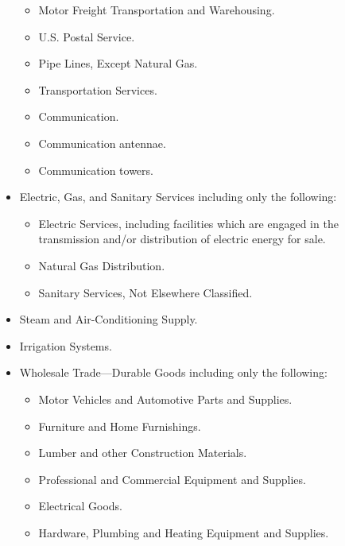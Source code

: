 \begin{itemize}
\begin{itemize}
\item Motor Freight Transportation and Warehousing.

\item U.S. Postal Service.

\item Pipe Lines, Except Natural Gas.

\item Transportation Services.

\item Communication.

\item Communication antennae.

\item Communication towers.
\end{itemize}
\item Electric, Gas, and Sanitary Services including only the following:
\begin{itemize}
\item Electric Services, including facilities which are engaged in the
transmission and/or distribution of electric energy for sale.

\item Natural Gas Distribution.

\item Sanitary Services, Not Elsewhere Classified.
\end{itemize}
\item Steam and Air-Conditioning Supply.

\item Irrigation Systems.

\item Wholesale Trade---Durable Goods including only the following:
\begin{itemize}
\item Motor Vehicles and Automotive Parts and Supplies.

\item Furniture and Home Furnishings.

\item Lumber and other Construction Materials.

\item Professional and Commercial Equipment and Supplies.

\item Electrical Goods.

\item Hardware, Plumbing and Heating Equipment and Supplies.


\end{itemize}
\end{itemize}
